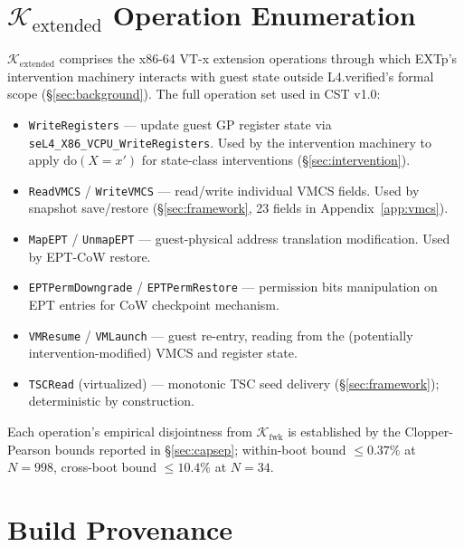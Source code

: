 \documentclass[conference]{IEEEtran}
\newcommand{\Kextended}{\mathcal{K}_\text{extended}}
\newcommand{\Kfwk}{\mathcal{K}_\text{fwk}}
\newcommand{\dox}[1]{\text{do}(X{=}#1)}
\begin{document}



\appendices

\section{$\Kextended$ Operation Enumeration}\label{app:kextended}

$\Kextended$ comprises the x86-64 VT-x extension operations
through which EXTp's intervention machinery interacts with guest
state outside L4.verified's formal scope (\S\ref{sec:background}).
The full operation set used in CST v1.0:

\begin{itemize}[itemsep=2pt,topsep=2pt,leftmargin=*]
\item \texttt{WriteRegisters} --- update guest GP register state
  via \texttt{seL4\_X86\_VCPU\_WriteRegisters}. Used by the
  intervention machinery to apply $\dox{x'}$ for state-class
  interventions (\S\ref{sec:intervention}).
\item \texttt{ReadVMCS} / \texttt{WriteVMCS} --- read/write
  individual VMCS fields. Used by snapshot save/restore
  (\S\ref{sec:framework}, 23 fields in Appendix~\ref{app:vmcs}).
\item \texttt{MapEPT} / \texttt{UnmapEPT} --- guest-physical
  address translation modification. Used by EPT-CoW restore.
\item \texttt{EPTPermDowngrade} / \texttt{EPTPermRestore} ---
  permission bits manipulation on EPT entries for CoW
  checkpoint mechanism.
\item \texttt{VMResume} / \texttt{VMLaunch} --- guest re-entry,
  reading from the (potentially intervention-modified) VMCS and
  register state.
\item \texttt{TSCRead} (virtualized) --- monotonic TSC seed
  delivery (\S\ref{sec:framework}); deterministic by construction.
\end{itemize}

Each operation's empirical disjointness from $\Kfwk$ is established
by the Clopper-Pearson bounds reported in \S\ref{sec:capsep};
within-boot bound $\leq 0.37\%$ at $N{=}998$, cross-boot bound
$\leq 10.4\%$ at $N{=}34$.

\section{Build Provenance}\label{app:build}
\end{document}
